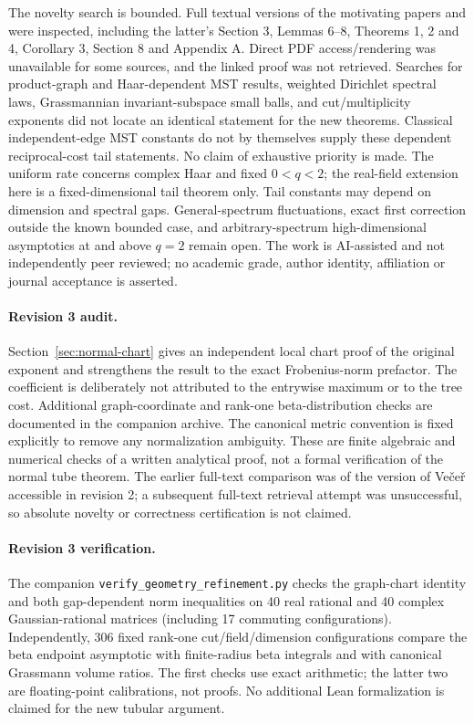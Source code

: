 \documentclass[11pt]{article}
\begin{document}
The novelty search is bounded. Full textual versions of the motivating papers and \cite{Vecer} were inspected, including the latter's Section 3, Lemmas 6--8, Theorems 1, 2 and 4, Corollary 3, Section 8 and Appendix A. Direct PDF access/rendering was unavailable for some sources, and the linked \cite{IRSI} proof was not retrieved. Searches for product-graph and Haar-dependent MST results, weighted Dirichlet spectral laws, Grassmannian invariant-subspace small balls, and cut/multiplicity exponents did not locate an identical statement for the new theorems. Classical independent-edge MST constants \cite{Frieze,Avram} do not by themselves supply these dependent reciprocal-cost tail statements. No claim of exhaustive priority is made. The uniform rate concerns complex Haar and fixed $0<q<2$; the real-field extension here is a fixed-dimensional tail theorem only. Tail constants may depend on dimension and spectral gaps. General-spectrum fluctuations, exact first correction outside the known bounded case, and arbitrary-spectrum high-dimensional asymptotics at and above $q=2$ remain open. The work is AI-assisted and not independently peer reviewed; no academic grade, author identity, affiliation or journal acceptance is asserted.

\paragraph{Revision 3 audit.} Section~\ref{sec:normal-chart} gives an independent local chart proof of the original exponent and strengthens the result to the exact Frobenius-norm prefactor. The coefficient is deliberately not attributed to the entrywise maximum or to the tree cost. Additional graph-coordinate and rank-one beta-distribution checks are documented in the companion archive. The canonical metric convention is fixed explicitly to remove any normalization ambiguity. These are finite algebraic and numerical checks of a written analytical proof, not a formal verification of the normal tube theorem. The earlier full-text comparison was of the version of Ve\v{c}e\v{r} accessible in revision 2; a subsequent full-text retrieval attempt was unsuccessful, so absolute novelty or correctness certification is not claimed.

\paragraph{Revision 3 verification.}
The companion \texttt{verify\_geometry\_refinement.py} checks the graph-chart identity and both gap-dependent norm inequalities on 40 real rational and 40 complex Gaussian-rational matrices (including 17 commuting configurations). Independently, 306 fixed rank-one cut/field/dimension configurations compare the beta endpoint asymptotic with finite-radius beta integrals and with canonical Grassmann volume ratios. The first checks use exact arithmetic; the latter two are floating-point calibrations, not proofs. No additional Lean formalization is claimed for the new tubular argument.
\end{document}
